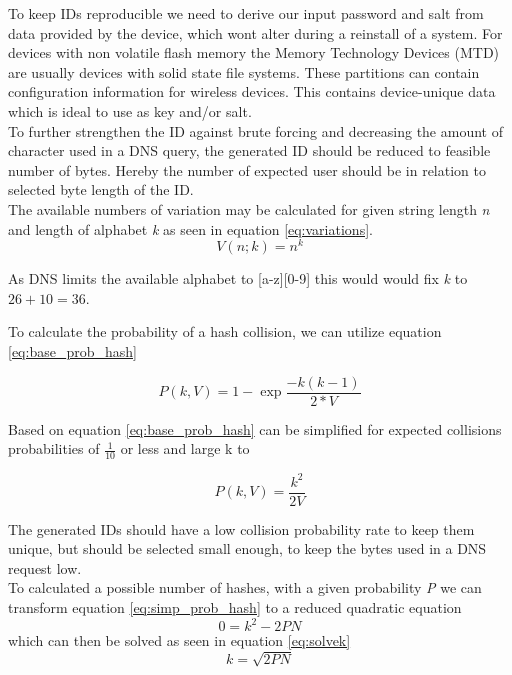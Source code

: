         To keep IDs reproducible we need to derive our input password and salt from data provided by the device, which wont alter during a reinstall of a system. For devices with non volatile flash memory the Memory Technology Devices (MTD) are usually devices with solid state file systems\cite{giometti_mtd_2017}\cite{woodhouse_memory_nodate}. These partitions can contain configuration information for wireless devices. This contains device-unique data which is ideal to use as key and/or salt.\\
        
        To further strengthen the ID against brute forcing and decreasing the amount of character used in a DNS query, the generated ID should be reduced to feasible number of bytes. Hereby the number of expected user should be in relation to selected byte length of the ID.\\
        The available numbers of variation may be calculated for given string length \textit{n} and length of alphabet \textit{k} as seen in equation \ref{eq:variations}.
        \begin{equation}
            \label{eq:variations}
            V(n;k) = n^{k}
        \end{equation}

        As DNS limits the available alphabet to [a-z][0-9] this would would fix \textit{k} to $26 + 10 = 36$.
        
        To calculate the probability of a hash collision, we can utilize equation \ref{eq:base_prob_hash}
        
        \begin{equation}
             \label{eq:base_prob_hash}
             P(k,V) = 1 - \exp{\frac{-k(k-1)}{2 * V}}
        \end{equation}
     
        Based on \cite{preshing_hash_2011} equation \ref{eq:base_prob_hash} can be simplified for expected collisions probabilities of $\frac{1}{10}$ or less and large k to
     
        \begin{equation}
            \label{eq:simp_prob_hash}
            P(k,V) = \frac{k^2}{2V} 
        \end{equation}
        
        The generated IDs should have a low collision probability rate to keep them unique, but should be selected small enough, to keep the bytes used in a DNS request low. \\
        To calculated a possible number of hashes, with a given probability \textit{P} we can transform equation \ref{eq:simp_prob_hash} to a reduced quadratic equation
        \begin{equation*}
            0 = k^2 - 2PN
        \end{equation*}
        which can then be solved as seen in equation \ref{eq:solvek}
        \begin{equation}
            \label{eq:solvek}
            k = \sqrt{2PN}
        \end{equation}
        
